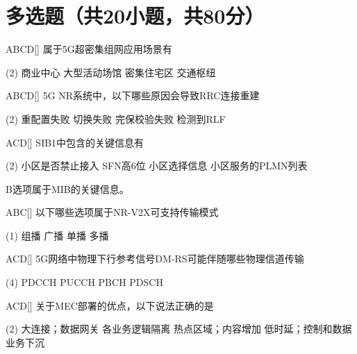 \section{多选题（共20小题，共80分）}

\begin{choice}{\;ABCD\;}[]
	属于5G超密集组网应用场景有
	\begin{tasks}(2)
		\task 商业中心
		\task 大型活动场馆
		\task 密集住宅区
		\task 交通枢纽
	\end{tasks}
\end{choice}

\begin{choice}{\;ABCD\;}[]
	5G NR系统中，以下哪些原因会导致RRC连接重建
	\begin{tasks}(2)
		\task 重配置失败
		\task 切换失败
		\task 完保校验失败
		\task 检测到RLF
	\end{tasks}
\end{choice}

\begin{choice}{\;ACD\;}[]
	SIB1中包含的关键信息有
	\begin{tasks}(2)
		\task 小区是否禁止接入
		\task SFN高6位
		\task 小区选择信息
		\task 小区服务的PLMN列表
	\end{tasks}
\end{choice}
\begin{solution}
  B选项属于MIB的关键信息。
\end{solution}
\begin{choice}{\;ABC\;}[]
	以下哪些选项属于NR-V2X可支持传输模式
	\begin{tasks}(1)
		\task 组播
		\task 广播
		\task 单播
		\task 多播
	\end{tasks}
\end{choice}


\begin{choice}{\;ACD\;}[]
	5G网络中物理下行参考信号DM-RS可能伴随哪些物理信道传输
	\begin{tasks}(4)
		\task PDCCH
		\task PUCCH
		\task PBCH
		\task PDSCH
	\end{tasks}
\end{choice}

\begin{choice}{\;ACD\;}[]
	关于MEC部署的优点，以下说法正确的是
	\begin{tasks}(2)
		\task 大连接；数据网关
		\task 各业务逻辑隔离
		\task 热点区域；内容增加
		\task 低时延；控制和数据业务下沉
	\end{tasks}
\end{choice}

